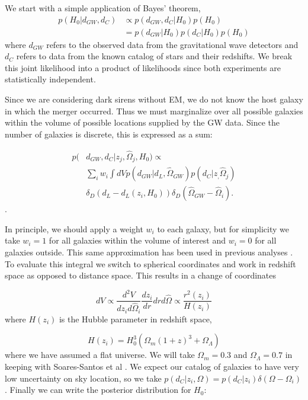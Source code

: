 
We start with a simple application of Bayes' theorem,
\begin{align}
    p(H_0|d_{GW}, d_C)&\propto p(d_{GW}, d_C|H_0)p(H_0)\nonumber\\
    &= p(d_{GW}|H_0)p(d_C|H_0)p(H_0)
\label{eq:bayes}
\end{align}
where $d_{GW}$ refers to the observed data from the gravitational wave detectors and $d_C$ refers to data from the known catalog of stars and their redshifts. We break this joint likelihood into a product of likelihoods since both experiments are statistically independent.

Since we are considering dark sirens without EM, we do not know the host galaxy in which the merger occurred. Thus we must marginalize over all possible galaxies within the volume of possible locations supplied by the GW data. Since the number of galaxies is discrete, this is expressed as a sum:

\begin{align}
    p(&d_{GW}, d_C|{z_j, \hat{\Omega}_j},H_0)  \propto  \nonumber\\
    &\sum_{i} w_i \int dV p(d_{GW}|d_L, \hat{\Omega}_{GW}) 
    p(d_C|{z_, \hat{\Omega}_j}) \nonumber\\
    & \delta_D (d_L - d_L(z_i, H_0)) \delta_D (\hat{\Omega}_{GW} - \hat{\Omega}_i).
    \label{eq:marginal_like}
\end{align}.

In principle, we should apply a weight $w_i$ to each galaxy, but for simplicity we take $w_i=1$ for all galaxies within the volume of interest and $w_i=0$ for all galaxies outside. This same approximation has been used in previous analyses \cite{Chen_2018,GW170814_DES,Nair_2018}. To evaluate this integral we switch to spherical coordinates and work in redshift space as opposed to distance space. This results in a change of coordinates

\begin{equation}
dV \propto \frac{d^2 V}{d z_i d\hat{\Omega}_i} \frac{d z_i}{d r} d r d\hat{\Omega} \propto \frac{r^2(z_i)}{H(z_i)}
\end{equation}
where $H(z_i)$ is the Hubble parameter in redshift space,

\begin{equation}
H(z_i) = H_0^3 \left(\Omega_m (1+z)^3 + \Omega_\Lambda\right)
\end{equation}
where we have assumed a flat universe. We will take $\Omega_m = 0.3$ and $\Omega_\Lambda = 0.7$ in keeping with Soares-Santos et al \cite{GW170814_DES}. We expect our catalog of galaxies to have very low uncertainty on sky location, so we take $p(d_C|z_i,\Omega)=p(d_C|z_i)\delta(\Omega - \Omega_i)$. Finally we can write the posterior distribution for $H_0$:

